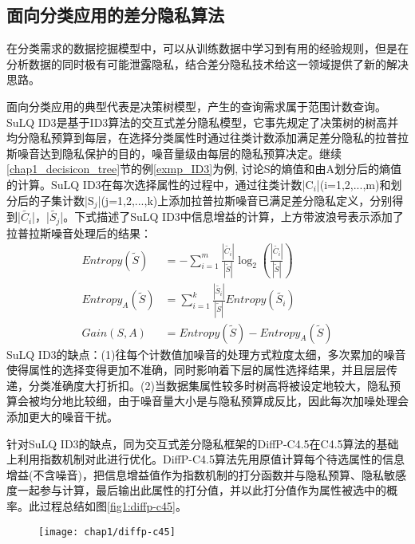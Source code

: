 \subsection{面向分类应用的差分隐私算法}  %

在分类需求的数据挖掘模型中，可以从训练数据中学习到有用的经验规则，但是在分析数据的同时极有可能泄露隐私，结合差分隐私技术给这一领域提供了新的解决思路。

面向分类应用的典型代表是决策树模型，产生的查询需求属于范围计数查询。SuLQ ID3\supercite{SuLQ}是基于ID3算法的交互式差分隐私模型，它事先规定了决策树的树高并均分隐私预算到每层，在选择分类属性时通过往类计数添加满足差分隐私的拉普拉斯噪音达到隐私保护的目的，噪音量级由每层的隐私预算决定。继续\ref{chap1_decisicon_tree}节的例\ref{exmp_ID3}为例,
讨论S的熵值和由A划分后的熵值的计算。SuLQ ID3在每次选择属性的过程中，通过往类计数|C$_{i}$|(i=1,2,...,m)和划分后的子集计数|S$_{j}$|(j=1,2,...,k)上添加拉普拉斯噪音已满足差分隐私定义，分别得到|$\widetilde{C_{i}}$|，|$\widetilde{S_{j}}$|。下式描述了SuLQ ID3中信息增益的计算，上方带波浪号表示添加了拉普拉斯噪音处理后的结果：
\[
\begin{split}
	Entropy(\tilde{S}) &= -\sum_{i=1}^{m}\frac{|\widetilde{C_{i}}|}{|\widetilde{S}|}\log_{2}(\frac{|\widetilde{C_{i}}|}{|\widetilde{S}|})\\
	Entropy_{A}(\tilde{S}) &= \sum_{i=1}^{k}\frac{|\widetilde{S_{i}}|}{|\widetilde{S}|}Entropy(\tilde{S_{i}})\\
	Gain(S,A) &= Entropy(\tilde{S})-Entropy_{A}(\tilde{S})
\end{split}	
\]
SuLQ ID3的缺点：(1)往每个计数值加噪音的处理方式粒度太细，多次累加的噪音使得属性的选择变得更加不准确，同时影响着下层的属性选择结果，并且层层传递，分类准确度大打折扣。(2)当数据集属性较多时树高将被设定地较大，隐私预算会被均分地比较细，由于噪音量大小是与隐私预算成反比，因此每次加噪处理会添加更大的噪音干扰。

针对SuLQ ID3的缺点，同为交互式差分隐私框架的DiffP-C4.5\supercite{diffp-c4.5}在C4.5算法的基础上利用指数机制\supercite{exponential}对此进行优化。DiffP-C4.5算法先用原值计算每个待选属性的信息增益(不含噪音)，把信息增益值作为指数机制的打分函数并与隐私预算、隐私敏感度一起参与计算，最后输出此属性的打分值，并以此打分值作为属性被选中的概率。此过程总结如图\ref{fig1:diffp-c45}。

\begin{figure}[!htp]
	\centering
	\texttt{[image: chap1/diffp-c45]}
\end{figure}

